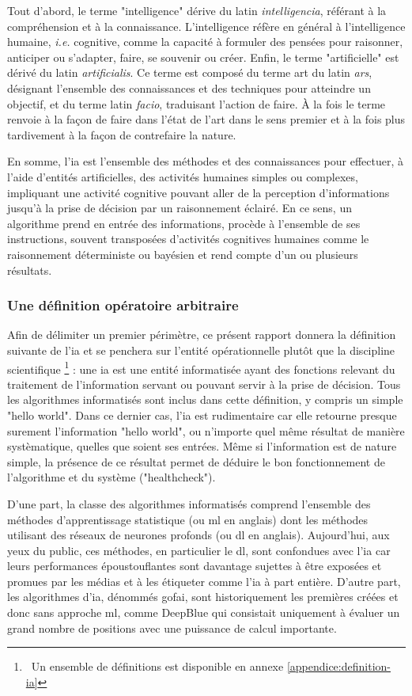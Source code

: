 Tout d'abord, le terme "intelligence" dérive du latin \textit{intelligencia}, référant à la compréhension et à la connaissance. L'intelligence réfère en général à l'intelligence humaine, \textit{i.e.} cognitive, comme la capacité à formuler des pensées pour raisonner, anticiper ou s'adapter, faire, se souvenir ou créer.
Enfin, le terme "artificielle" est dérivé du latin \textit{artificialis}. Ce terme est composé du terme art du latin \textit{ars}, désignant l'ensemble des connaissances et des techniques pour atteindre un objectif, et du terme latin \textit{facio}, traduisant l'action de faire. À la fois le terme renvoie à la façon de faire dans l'état de l'art dans le sens premier et à la fois plus tardivement à la façon de contrefaire la nature.

En somme, l'\gls{ia} est l'ensemble des méthodes et des connaissances pour effectuer, à l'aide d'entités artificielles, des activités humaines simples ou complexes, impliquant une activité cognitive pouvant aller de la perception d'informations jusqu'à la prise de décision par un raisonnement éclairé. En ce sens, un algorithme prend en entrée des informations, procède à l'ensemble de ses instructions, souvent transposées d'activités cognitives humaines comme le raisonnement déterministe ou bayésien et rend compte d'un ou plusieurs résultats.

\subsubsection{Une définition opératoire arbitraire}
Afin de délimiter un premier périmètre, ce présent rapport donnera la définition suivante de l'\gls{ia} et se penchera sur l'entité opérationnelle plutôt que la discipline scientifique \footnote{~Un ensemble de définitions est disponible en annexe \ref{appendice:definition-ia}} : une \gls{ia} est une entité informatisée ayant des fonctions relevant du traitement de l'information servant ou pouvant servir à la prise de décision. Tous les algorithmes informatisés sont inclus dans cette définition, y compris un simple "hello world". Dans ce dernier cas, l'\gls{ia} est rudimentaire car elle retourne presque surement l'information "hello world", ou n'importe quel même résultat de manière systèmatique, quelles que soient ses entrées. Même si l'information est de nature simple, la présence de ce résultat permet de déduire le bon fonctionnement de l'algorithme et du système ("healthcheck").

D'une part, la classe des algorithmes informatisés comprend l'ensemble des méthodes d'apprentissage statistique (ou \gls{ml} en anglais) dont les méthodes utilisant des réseaux de neurones profonds (ou \gls{dl} en anglais). Aujourd'hui, aux yeux du public, ces méthodes, en particulier le \gls{dl}, sont confondues avec l'\gls{ia} car leurs performances époustouflantes sont davantage sujettes à être exposées et promues par les médias et à les étiqueter comme l'\gls{ia} à part entière. D'autre part, les algorithmes d'\gls{ia}, dénommés \gls{gofai}, sont historiquement les premières créées et donc sans approche \gls{ml}, comme DeepBlue qui consistait uniquement à évaluer un grand nombre de positions avec une puissance de calcul importante.


